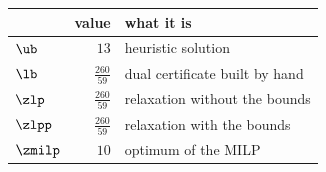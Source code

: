 \begin{center}\small
\begin{tabular}{lrl}
\toprule
 & value & what it is \\
\midrule
$\ub$ & $13$ & heuristic solution \\
$\lb$ & $\frac{260}{59}$ & dual certificate built by hand \\
$\zlp$ & $\frac{260}{59}$ & relaxation without the bounds \\
$\zlpp$ & $\frac{260}{59}$ & relaxation with the bounds \\
$\zmilp$ & $10$ & optimum of the MILP \\
\bottomrule
\end{tabular}
\end{center}
